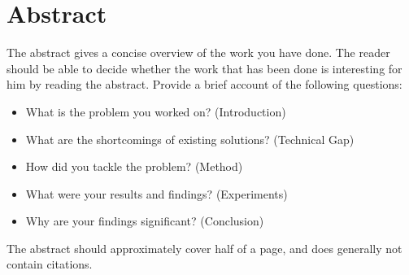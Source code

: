 %

\newpage
\vspace{3cm}

\chapter*{Abstract}
\noindent The abstract gives a concise overview of the work you have done. The reader should be able to decide whether the work that has been done is interesting for him by reading the abstract. Provide a brief account of the following questions:

\begin{itemize}
 \item What is the problem you worked on? (Introduction)
 \item What are the shortcomings of existing solutions? (Technical Gap)
 \item How did you tackle the problem? (Method)
 \item What were your results and findings? (Experiments)
 \item Why are your findings significant? (Conclusion)
\end{itemize}

\noindent The abstract should approximately cover half of a page, and does generally not contain citations.


